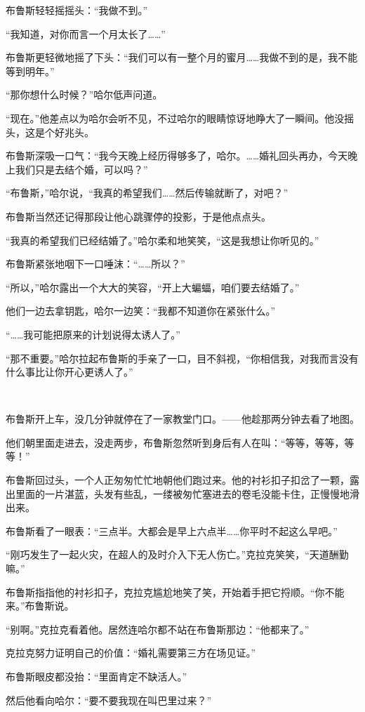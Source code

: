\documentclass[../main]{subfiles}
\begin{document}
布鲁斯轻轻摇摇头：“我做不到。”

“我知道，对你而言一个月太长了……”

布鲁斯更轻微地摇了下头：“我们可以有一整个月的蜜月……我做不到的是，我不能等到明年。”

“那你想什么时候？”哈尔低声问道。

“现在。”他差点以为哈尔会听不见，不过哈尔的眼睛惊讶地睁大了一瞬间。他没摇头，这是个好兆头。

布鲁斯深吸一口气：“我今天晚上经历得够多了，哈尔。……婚礼回头再办，今天晚上我们只是去结个婚，可以吗？”

“布鲁斯，”哈尔说，“我真的希望我们……然后传输就断了，对吧？”

布鲁斯当然还记得那段让他心跳骤停的投影，于是他点点头。

“我真的希望我们已经结婚了。”哈尔柔和地笑笑，“这是我想让你听见的。”

布鲁斯紧张地咽下一口唾沫：“……所以？”

“所以，”哈尔露出一个大大的笑容，“开上大蝙蝠，咱们要去结婚了。”

他们一边去拿钥匙，哈尔一边笑：“我都不知道你在紧张什么。”

“……我可能把原来的计划说得太诱人了。”

“那不重要。”哈尔拉起布鲁斯的手亲了一口，目不斜视，“你相信我，对我而言没有什么事比让你开心更诱人了。”

~\

布鲁斯开上车，没几分钟就停在了一家教堂门口。——他趁那两分钟去看了地图。

他们朝里面走进去，没走两步，布鲁斯忽然听到身后有人在叫：“等等，等等，等等！”

布鲁斯回过头，一个人正匆匆忙忙地朝他们跑过来。他的衬衫扣子扣岔了一颗，露出里面的一片湛蓝，头发有些乱，一缕被匆忙塞进去的卷毛没能卡住，正慢慢地滑出来。

布鲁斯看了一眼表：“三点半。大都会是早上六点半……你平时不起这么早吧。”

“刚巧发生了一起火灾，在超人的及时介入下无人伤亡。”克拉克笑笑，“天道酬勤嘛。”

布鲁斯指指他的衬衫扣子，克拉克尴尬地笑了笑，开始着手把它捋顺。“你不能来。”布鲁斯说。

“别啊。”克拉克看着他。居然连哈尔都不站在布鲁斯那边：“他都来了。”

克拉克努力证明自己的价值：“婚礼需要第三方在场见证。”

布鲁斯眼皮都没抬：“里面肯定不缺活人。”

然后他看向哈尔：“要不要我现在叫巴里过来？”
\end{document}
